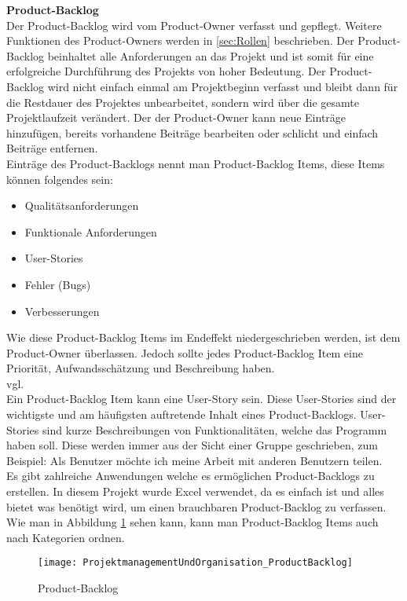 			\textbf{Product-Backlog} \\
				Der Product-Backlog wird vom Product-Owner verfasst und gepflegt. Weitere Funktionen des Product-Owners werden in \ref{sec:Rollen} beschrieben. Der Product-Backlog beinhaltet alle Anforderungen an das Projekt und ist somit für eine erfolgreiche Durchführung des Projekts von hoher Bedeutung. Der Product-Backlog wird nicht einfach einmal am Projektbeginn verfasst und bleibt dann für die Restdauer des Projektes unbearbeitet, sondern wird über die gesamte Projektlaufzeit verändert. Der der Product-Owner kann neue Einträge hinzufügen, bereits vorhandene Beiträge bearbeiten oder schlicht und einfach Beiträge entfernen. \\
				Einträge des Product-Backlogs nennt man Product-Backlog Items, diese Items können folgendes sein: 
				\begin{itemize}
					\item Qualitätsanforderungen
					\item Funktionale Anforderungen
					\item User-Stories
					\item Fehler (Bugs)
					\item Verbesserungen
				\end{itemize}
				Wie diese Product-Backlog Items im Endeffekt niedergeschrieben werden, ist dem Product-Owner überlassen. Jedoch sollte jedes Product-Backlog Item eine Priorität, Aufwandsschätzung und Beschreibung haben.\\ vgl.\textcite{ScrumProduct-Backlog} \\
				Ein Product-Backlog Item kann eine User-Story sein. Diese User-Stories sind der wichtigste und am häufigsten auftretende Inhalt eines Product-Backlogs. User-Stories sind kurze Beschreibungen von Funktionalitäten, welche das Programm haben soll. Diese werden immer aus der Sicht einer Gruppe geschrieben, zum Beispiel: Als Benutzer möchte ich meine Arbeit mit anderen Benutzern teilen. \\
				Es gibt zahlreiche Anwendungen welche es ermöglichen Product-Backlogs zu erstellen. In diesem Projekt wurde Excel verwendet, da es einfach ist und alles bietet was benötigt wird, um einen brauchbaren Product-Backlog zu verfassen. Wie man in Abbildung \ref{fig:productBacklog} sehen kann, kann man Product-Backlog Items auch nach Kategorien ordnen. \\
\begin{figure}[H]	
	\texttt{[image: ProjektmanagementUndOrganisation\_ProductBacklog]}
    \caption{Product-Backlog}
    \label{fig:productBacklog}
\end{figure}
				
